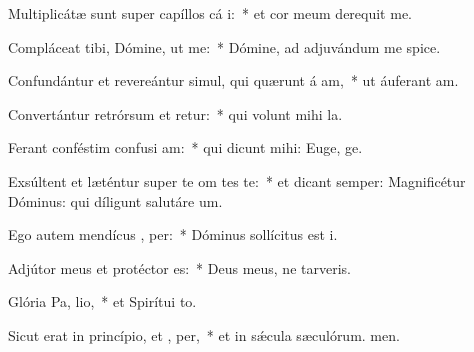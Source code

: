 \item Multiplicátæ sunt super capíllos cá i:~* et cor meum derequit me.
\item Compláceat tibi, Dómine, ut  me:~* Dómine, ad adjuvándum me spice.
\item Confundántur et revereántur simul, qui quærunt á am,~* ut áuferant am.
\item Convertántur retrórsum et retur:~* qui volunt mihi la.
\item Ferant conféstim confusi am:~* qui dicunt mihi: Euge, ge.
\item Exsúltent et læténtur super te om tes te:~* et dicant semper: Magnificétur Dóminus: qui díligunt salutáre um.
\item Ego autem mendícus ,  per:~* Dóminus sollícitus est i.
\item Adjútor meus et protéctor   es:~* Deus meus, ne tarveris.
\item Glória Pa,  lio,~* et Spirítui to.
\item Sicut erat in princípio, et ,  per,~* et in sǽcula sæculórum. men.
